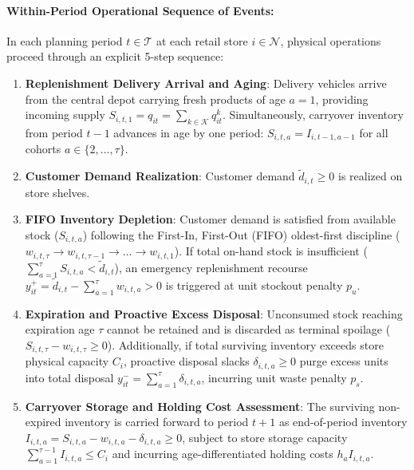 \documentclass[11pt,a4paper]{article}
\theoremstyle{definition}
\theoremstyle{remark}
\begin{document}
\paragraph{Within-Period Operational Sequence of Events:}
In each planning period $t \in \mathcal{T}$ at each retail store $i \in \mathcal{N}$, physical operations proceed through an explicit 5-step sequence:
\begin{enumerate}[label=\textbf{Step \arabic*.},leftmargin=*]
    \item \textbf{Replenishment Delivery Arrival and Aging}: Delivery vehicles arrive from the central depot carrying fresh products of age $a=1$, providing incoming supply $S_{i,t,1} = q_{it} = \sum_{k \in \mathcal{K}} q_{it}^k$. Simultaneously, carryover inventory from period $t-1$ advances in age by one period: $S_{i,t,a} = I_{i,t-1,a-1}$ for all cohorts $a \in \{2, \dots, \tau\}$.
    \item \textbf{Customer Demand Realization}: Customer demand $\tilde{d}_{i,t} \ge 0$ is realized on store shelves.
    \item \textbf{FIFO Inventory Depletion}: Customer demand is satisfied from available stock ($S_{i,t,a}$) following the First-In, First-Out (FIFO) oldest-first discipline ($w_{i,t,\tau} \to w_{i,t,\tau-1} \to \dots \to w_{i,t,1}$). If total on-hand stock is insufficient ($\sum_{a=1}^\tau S_{i,t,a} < \tilde{d}_{i,t}$), an emergency replenishment recourse $y_{it}^+ = \tilde{d}_{i,t} - \sum_{a=1}^\tau w_{i,t,a} > 0$ is triggered at unit stockout penalty $p_u$.
    \item \textbf{Expiration and Proactive Excess Disposal}: Unconsumed stock reaching expiration age $\tau$ cannot be retained and is discarded as terminal spoilage ($S_{i,t,\tau} - w_{i,t,\tau} \ge 0$). Additionally, if total surviving inventory exceeds store physical capacity $C_i$, proactive disposal slacks $\delta_{i,t,a} \ge 0$ purge excess units into total disposal $y_{it}^- = \sum_{a=1}^\tau \delta_{i,t,a}$, incurring unit waste penalty $p_s$.
    \item \textbf{Carryover Storage and Holding Cost Assessment}: The surviving non-expired inventory is carried forward to period $t+1$ as end-of-period inventory $I_{i,t,a} = S_{i,t,a} - w_{i,t,a} - \delta_{i,t,a} \ge 0$, subject to store storage capacity $\sum_{a=1}^{\tau-1} I_{i,t,a} \le C_i$ and incurring age-differentiated holding costs $h_a I_{i,t,a}$.
\end{enumerate}
\end{document}
